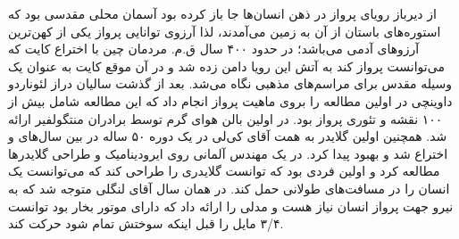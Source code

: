 از دیرباز رویای پرواز در ذهن انسان‌ها جا باز کرده بود آسمان محلی مقدسی بود که استوره‌های باستان از آن به زمین می‌آمدند، لذا آرزوی توانایی پرواز یکی از کهن‌ترین آرزوهای آدمی می‌باشد؛ در حدود ۴۰۰ سال ق.م. مردمان چین با اختراع کایت که می‌توانست پرواز کند به آتش این رویا دامن زده شد و در آن موقع کایت به عنوان یک وسیله مقدس برای مراسم‌های مذهبی نگاه می‌شد. بعد از گذشت سالیان دراز لئوناردو داوینچی در  اولین مطالعه را بروی ماهیت پرواز انجام داد که این مطالعه شامل بیش از ۱۰۰ نقشه و تئوری پرواز بود. در  اولین بالن هوای گرم توسط برادران منتگولفیر ارائه شد. همچنین اولین گلایدر به همت آقای کی‌لی در یک دوره ۵۰ ساله در بین سال‌های  و  اختراع شد و بهبود پیدا کرد. در  یک مهندس آلمانی روی ایرودینامیک و طراحی گلایدرها مطالعه کرد و اولین فردی بود که توانست گلایدری را طراحی کند که می‌توانست یک انسان را در مسافت‌های طولانی حمل کند. در همان سال آقای لنگلی متوجه شد که به نیرو جهت پرواز انسان نیاز هست و مدلی را ارائه داد که دارای موتور بخار بود توانست ۳/۴ مایل را قبل اینکه سوختش تمام شود حرکت کند.
\cite{nesta:drobes, wiki:quadcopter}